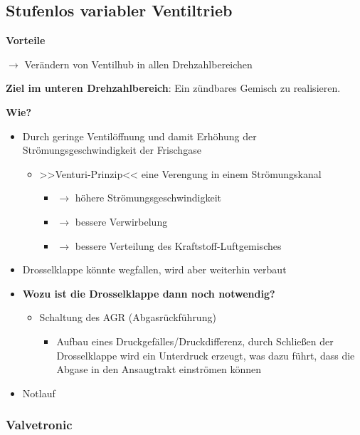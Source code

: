 \subsection{Stufenlos variabler
Ventiltrieb}\label{stufenlos-variabler-ventiltrieb}

\textbf{Vorteile}

$\to$ Verändern von Ventilhub in allen Drehzahlbereichen

\textbf{Ziel im unteren Drehzahlbereich}: Ein zündbares Gemisch zu
realisieren.

\textbf{Wie?}

\begin{itemize}
\item
  Durch geringe Ventilöffnung und damit Erhöhung der
  Strömungsgeschwindigkeit der Frischgase

  \begin{itemize}
  \item
    >>Venturi-Prinzip<< eine Verengung in einem Strömungskanal

    \begin{itemize}
    \item
      $\to$ höhere Strömungsgeschwindigkeit
    \item
      $\to$ bessere Verwirbelung
    \item
      $\to$ bessere Verteilung des Kraftstoff-Luftgemisches
    \end{itemize}
  \end{itemize}
\item
  Drosselklappe könnte wegfallen, wird aber weiterhin verbaut
\item
  \textbf{Wozu ist die Drosselklappe dann noch notwendig?}

  \begin{itemize}
  \item
    Schaltung des AGR (Abgasrückführung)

    \begin{itemize}
    \item
      Aufbau eines Druckgefälles/Druckdifferenz, durch Schließen der
      Drosselklappe wird ein Unterdruck erzeugt, was dazu führt, dass
      die Abgase in den Ansaugtrakt einströmen können
    \end{itemize}
  \end{itemize}
\item
  Notlauf
\end{itemize}

\subsubsection{Valvetronic}\label{valvetronic}

